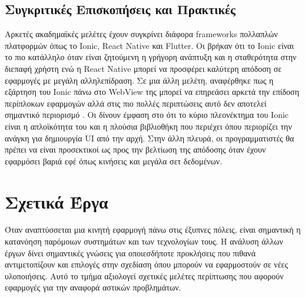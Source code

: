 \subsection{Συγκριτικές Επισκοπήσεις και Πρακτικές}
Αρκετές ακαδημαϊκές μελέτες έχουν συγκρίνει διάφορα frameworks πολλαπλών πλατφορμών όπως το Ionic, React Native και Flutter. Οι \textcite{majchrzak2017comprehensive} βρήκαν ότι το Ionic είναι το πιο κατάλληλο όταν είναι ζητούμενη η γρήγορη ανάπτυξη και η σταθερότητα στην διεπαφή χρήστη ενώ η React Native μπορεί να προσφέρει καλύτερη απόδοση σε εφαρμογές με μεγάλη αλληλεπίδραση. Σε μια άλλη μελέτη, αναφέρθηκε πως η εξάρτηση του Ionic πάνω στο WebView της μπορεί να επηρεάσει αρκετά την επίδοση περίπλοκων εφαρμογών αλλά στις πιο πολλές περιπτώσεις αυτό δεν αποτελεί σημαντικό περιορισμό \parencite{you2021comparative}. Οι \textcite{Sonar2023Hybrid} δίνουν έμφαση στο ότι το κύριο πλεονέκτημα του Ionic είναι η απλοϊκότητα του και η πλούσια βιβλιοθήκη που περιέχει όπου περιορίζει την ανάγκη για δημιουργία UI από την αρχή. Στην άλλη πλευρά, οι προγραμματιστές θα πρέπει να είναι προσεκτικοί ως προς την βελτίωση της απόδοσης όταν έχουν εφαρμόσει βαριά εφέ όπως κινήσεις και μεγάλα σετ δεδομένων. 
\\
\section{Σχετικά Έργα}
Όταν αναπτύσσεται μια κινητή εφαρμογή πάνω στις έξυπνες πόλεις, είναι σημαντική η κατανόηση παρόμοιων συστημάτων και των τεχνολογίων τους. Η ανάλυση άλλων έργων δίνει σημαντικές γνώσεις για οποιεσδήποτε προκλήσεις που πιθανά αντιμετοπίζουν και επιλογές στην σχεδίαση όπου μπορούν να εφαρμοστούν σε νέες υλοποιήσεις. Αυτό το τμήμα αξιολογεί σχετικές μελέτες περίπτωσης που αφορούν εφαρμογές για την αναφορά αστικών προβλημάτων.

